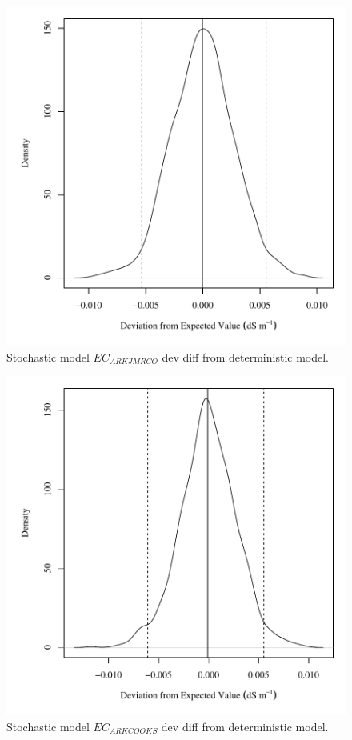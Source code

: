 \begin{center}
\begin{figure}[htbp]
	\includegraphics[width=6in]{"Figures/Results_DSR/V dev diff ecin"}
	\caption{Stochastic model $EC_{ARKJMRCO}$ dev diff from deterministic model.}
\end{figure}
\end{center}
\newpage

\begin{center}
\begin{figure}[htbp]
	\includegraphics[width=6in]{"Figures/Results_DSR/V dev diff ecout"}
	\caption{Stochastic model $EC_{ARKCOOKS}$ dev diff from deterministic model.}
\end{figure}
\end{center}
\newpage

